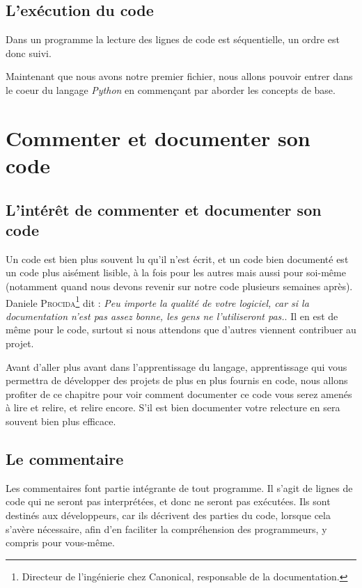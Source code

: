 \documentclass[a4paper,12pt]{book}
\begin{document}
\section{L'exécution du code}
Dans un programme la lecture des lignes de code est séquentielle, un ordre est donc suivi. 
\medskip

Maintenant que nous avons notre premier fichier, nous allons pouvoir entrer dans le coeur du langage \textit{Python} en commençant par aborder les concepts de base.
\medskip



\chapter{Commenter et documenter son code}
\section{L'intérêt de commenter et documenter son code}
Un code est bien plus souvent lu qu'il n'est écrit, et un code bien documenté est un code plus aisément lisible, à la fois pour les autres mais aussi pour soi-même (notamment quand nous devons revenir sur notre code plusieurs semaines après). Daniele \textsc{Procida}\footnote{Directeur de l'ingénierie chez Canonical, responsable de la documentation.} dit : \og \textit{Peu importe la qualité de votre logiciel, car si la documentation n'est pas assez bonne, les gens ne l'utiliseront pas.}\fg{}. Il en est de même pour le code, surtout si nous attendons que d'autres viennent contribuer au projet.
\medskip

Avant d'aller plus avant dans l'apprentissage du langage, apprentissage qui vous permettra de développer des projets de plus en plus fournis en code, nous allons profiter de ce chapitre pour voir comment documenter ce code vous serez amenés à lire et relire, et relire encore. S'il est bien documenter votre relecture en sera souvent bien plus efficace.
\medskip

\section{Le commentaire}
Les commentaires font partie intégrante de tout programme. Il s'agit de lignes de code qui ne seront pas interprétées, et donc ne seront pas exécutées. Ils sont destinés aux développeurs, car ils décrivent des parties du code, lorsque cela s'avère nécessaire, afin d'en faciliter la compréhension des programmeurs, y compris pour vous-même.
\medskip
\end{document}
